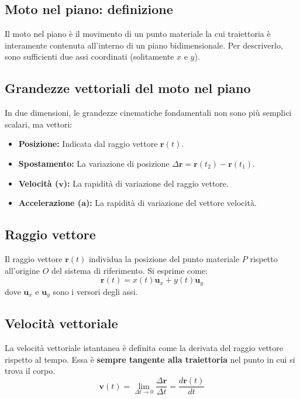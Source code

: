 \documentclass[12pt]{article}
\begin{document}
\subsection*{Moto nel piano: definizione}
Il moto nel piano è il movimento di un punto materiale la cui traiettoria è interamente contenuta all'interno di un piano bidimensionale. Per descriverlo, sono sufficienti due assi coordinati (solitamente $x$ e $y$).

\subsection*{Grandezze vettoriali del moto nel piano}
In due dimensioni, le grandezze cinematiche fondamentali non sono più semplici scalari, ma vettori:
\begin{itemize}
    \item \textbf{Posizione:} Indicata dal raggio vettore $\mathbf{r}(t)$.
    \item \textbf{Spostamento:} La variazione di posizione $\Delta\mathbf{r} = \mathbf{r}(t_2) - \mathbf{r}(t_1)$.
    \item \textbf{Velocità ($\mathbf{v}$):} La rapidità di variazione del raggio vettore.
    \item \textbf{Accelerazione ($\mathbf{a}$):} La rapidità di variazione del vettore velocità.
\end{itemize}

\subsection*{Raggio vettore}
Il raggio vettore $\mathbf{r}(t)$ individua la posizione del punto materiale $P$ rispetto all'origine $O$ del sistema di riferimento. Si esprime come:
\begin{equation}
\mathbf{r}(t) = x(t)\mathbf{u}_x + y(t)\mathbf{u}_y
\end{equation}
dove $\mathbf{u}_x$ e $\mathbf{u}_y$ sono i versori degli assi.

\subsection*{Velocità vettoriale}
La velocità vettoriale istantanea è definita come la derivata del raggio vettore rispetto al tempo. Essa è \textbf{sempre tangente alla traiettoria} nel punto in cui si trova il corpo.
\begin{equation}
\mathbf{v}(t) = \lim_{\Delta t \to 0} \frac{\Delta\mathbf{r}}{\Delta t} = \frac{d\mathbf{r}(t)}{dt}
\end{equation}
\end{document}
